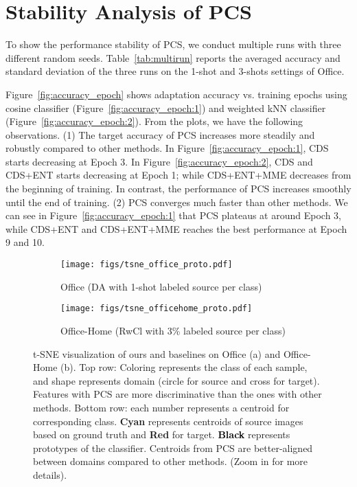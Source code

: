 \documentclass[final]{cvpr}
\begin{document}
\section{Stability Analysis of PCS}

To show the performance stability of PCS, we conduct multiple runs with three different random seeds. Table~\ref{tab:multirun} reports the averaged accuracy and standard deviation of the three runs on the 1-shot and 3-shots settings of Office.




Figure~\ref{fig:accuracy_epoch} shows adaptation accuracy vs. training epochs using cosine classifier (Figure~\ref{fig:accuracy_epoch:1}) and weighted kNN classifier (Figure~\ref{fig:accuracy_epoch:2}). From the plots, we have the following observations. (1) The target accuracy of PCS increases more steadily and robustly compared to other methods. In Figure~\ref{fig:accuracy_epoch:1}, CDS starts decreasing at Epoch 3. In Figure~\ref{fig:accuracy_epoch:2}, CDS and CDS+ENT starts decreasing at Epoch 1; while CDS+ENT+MME decreases from the beginning of training. In contrast, the performance of PCS increases smoothly until the end of training. (2) PCS converges much faster than other methods. We can see in Figure~\ref{fig:accuracy_epoch:1} that PCS plateaus at around Epoch 3, while CDS+ENT and CDS+ENT+MME reaches the best performance at Epoch 9 and 10. 






\begin{figure*}[t]
    \centering
    \begin{subfigure}{\textwidth}
        \centering
        \texttt{[image: figs/tsne\_office\_proto.pdf]}
        \caption{Office (DA with 1-shot labeled source per class)}
        \label{fig:tsne_office_proto}
    \end{subfigure}\par\bigskip
    
    \begin{subfigure}{\textwidth}
        \centering
        \texttt{[image: figs/tsne\_officehome\_proto.pdf]}
        \caption{Office-Home (RwCl with 3\% labeled source per class)}
        \label{fig:tsne_officehome_proto}
    \end{subfigure}\caption{t-SNE visualization of ours and baselines on Office (a) and Office-Home (b). Top row: Coloring represents the class of each sample, and shape represents domain (circle for source and cross for target). Features with PCS are more discriminative than the ones with other methods. Bottom row: each number represents a centroid for corresponding class. \textbf{\textcolor{my_cyan}{Cyan}} represents centroids of source images based on ground truth and \textbf{\textcolor{myMaroon}{Red}} for target. \textbf{\textcolor{black}{Black}} represents prototypes of the classifier. Centroids from PCS are better-aligned between domains compared to other methods. (Zoom in for more details).}
    \label{fig:tsne_proto}
\end{figure*}
\end{document}
